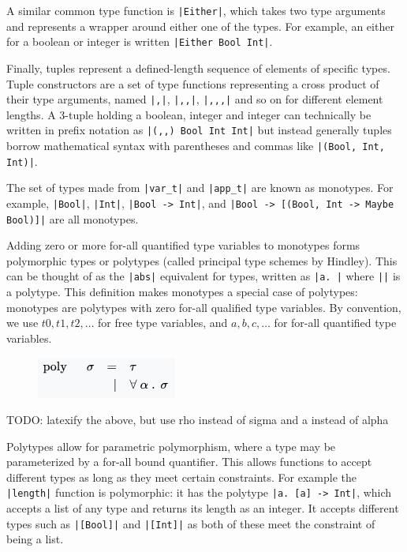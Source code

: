 \documentclass[a4paper,fleqn,12pt]{article}
\begin{document}
A similar common type function is \texttt{|Either|}, which takes two type arguments and represents a wrapper around either one of the types. For example, an either for a boolean or integer is written \texttt{|Either Bool Int|}.

Finally, tuples represent a defined-length sequence of elements of specific types. Tuple constructors are a set of type functions representing a cross product of their type arguments, named \texttt{|,|}, \texttt{|,,|}, \texttt{|,,,|} and so on for different element lengths. A 3-tuple holding a boolean, integer and integer can technically be written in prefix notation as \texttt{|(,,) Bool Int Int|} but instead generally tuples borrow mathematical syntax with parentheses and commas like \texttt{|(Bool, Int, Int)|}.

The set of types made from \texttt{|var\_t|} and \texttt{|app\_t|} are known as monotypes. For example, \texttt{|Bool|}, \texttt{|Int|}, \texttt{|Bool -> Int|}, and \texttt{|Bool -> [(Bool, Int -> Maybe Bool)]|} are all monotypes.

Adding zero or more for-all quantified type variables to monotypes forms polymorphic types or polytypes (called principal type schemes by Hindley). This can be thought of as the \texttt{|abs|} equivalent for types, written as \texttt{|\forall a. \rho|} where \texttt{|\rho|} is a polytype. This definition makes monotypes a special case of polytypes: monotypes are polytypes with zero for-all qualified type variables. By convention, we use $t0, t1, t2, \dots$ for free type variables, and $a, b, c, \dots$ for for-all quantified type variables.

\begin{figure}[h!]
  \centering
  \includegraphics[width=0.290\linewidth]{images/image8.png}
\end{figure}

TODO: latexify the above, but use rho instead of sigma and a instead of alpha

Polytypes allow for parametric polymorphism, where a type may be parameterized by a for-all bound quantifier. This allows functions to accept different types as long as they meet certain constraints. For example the \texttt{|length|} function is polymorphic: it has the polytype \texttt{|\forall a. [a] -> Int|}, which accepts a list of any type and returns its length as an integer. It accepts different types such as \texttt{|[Bool]|} and \texttt{|[Int]|} as both of these meet the constraint of being a list.
\end{document}
